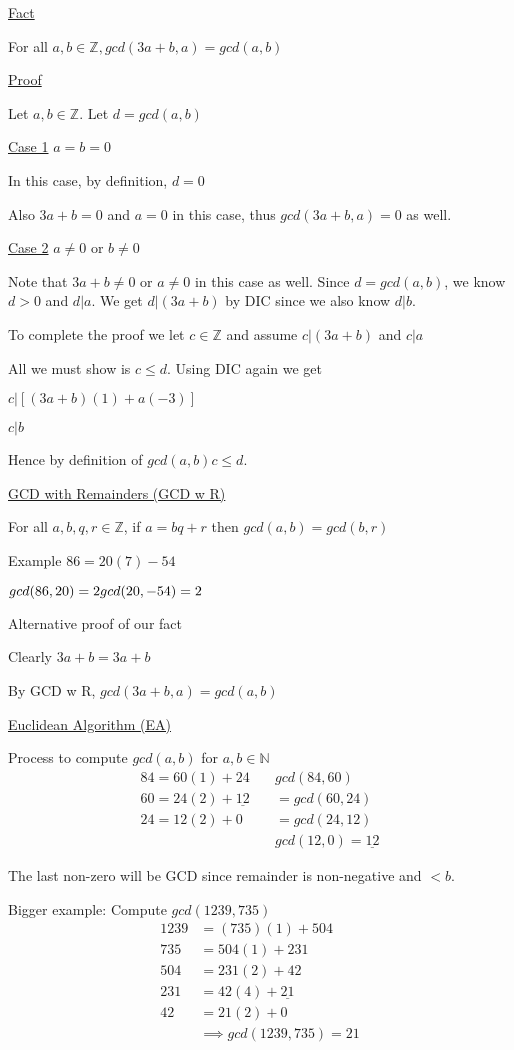 \documentclass{article}
\begin{document}
\underline{Fact}

For all $a,b \in \mathbb{Z}, gcd(3a + b, a) = gcd(a,b)$

\underline{Proof}

Let $a,b \in \mathbb{Z}$. Let $d = gcd(a,b)$

\underline{Case 1} $a=b=0$

In this case, by definition, $d=0$

Also $3a+b=0$ and $a=0$ in this case, thus $gcd(3a+b,a)=0$ as well.

\underline{Case 2} $a \ne 0$ or $b \ne 0$

Note that $3a + b \ne 0$ or $a \ne 0$ in this case as well. Since $d = gcd(a,b)$, we know $d > 0$ and $d \vert a$. We get $d \vert (3a + b)$ by DIC since we also know $d \vert b$. 

To complete the proof we let $c \in \mathbb{Z}$ and assume $c \vert (3a + b)$ and $c \vert a$

All we must show is $c \le d$. Using DIC again we get 

$c \vert [(3a+b)(1) + a(-3)]$

$c \vert b$

Hence by definition of $gcd(a,b) c \le d.$

\underline{GCD with Remainders (GCD w R)}

For all $a,b,q,r \in \mathbb{Z}$, if $a = bq + r$ then $gcd(a,b) = gcd(b,r)$

Example $86 = 20(7) - 54$

$gcd(86,20) = 2 \\
gcd(20,-54) = 2$

Alternative proof of our fact

Clearly $3a + b = 3a + b$

By GCD w R, $gcd(3a+b,a) = gcd(a,b)$

\underline{Euclidean Algorithm (EA)}

Process to compute $gcd(a,b)$ for $a,b \in \mathbb{N}$
\begin{align*}
    84 = 60(1) + 24 &\quad gcd(84,60) \\
    60 = 24(2) + \underline{12} &\quad = gcd(60,24) \\
    24 = 12(2) + 0 &\quad = gcd(24,12) \\
    &\quad gcd(12,0) = \underline{12}
\end{align*}

The last non-zero will be GCD since remainder is non-negative and $< b$.

Bigger example: Compute $gcd(1239,735)$
\begin{align*}
    1239 &= (735)(1) + 504 \\
    735 &= 504(1) + 231 \\
    504 &= 231(2) + 42 \\
    231 &= 42(4) + \underline{21} \\
    42 &= 21(2) + 0 \\
    &\implies gcd(1239,735) =21 
\end{align*}
\end{document}
